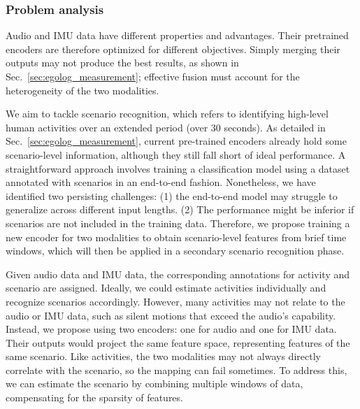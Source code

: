 \subsubsection{Problem analysis}
Audio and IMU data have different properties and advantages. Their pretrained encoders are therefore optimized for different objectives. Simply merging their outputs may not produce the best results, as shown in Sec.~\ref{sec:egolog_measurement}; effective fusion must account for the heterogeneity of the two modalities.

We aim to tackle scenario recognition, which refers to identifying high-level human activities over an extended period (over 30 seconds). As detailed in Sec.~\ref{sec:egolog_measurement}, current pre-trained encoders already hold some scenario-level information, although they still fall short of ideal performance. A straightforward approach involves training a classification model using a dataset annotated with scenarios in an end-to-end fashion. Nonetheless, we have identified two persisting challenges: (1) the end-to-end model may struggle to generalize across different input lengths. (2) The performance might be inferior if scenarios are not included in the training data. Therefore, we propose training a new encoder for two modalities to obtain scenario-level features from brief time windows, which will then be applied in a secondary scenario recognition phase.

Given audio data and IMU data, the corresponding annotations for activity and scenario are assigned. Ideally, we could estimate activities individually and recognize scenarios accordingly. However, many activities may not relate to the audio or IMU data, such as silent motions that exceed the audio's capability.
Instead, we propose using two encoders: one for audio and one for IMU data. Their outputs would project the same feature space, representing features of the same scenario. Like activities, the two modalities may not always directly correlate with the scenario, so the mapping can fail sometimes. To address this, we can estimate the scenario by combining multiple windows of data, compensating for the sparsity of features.

